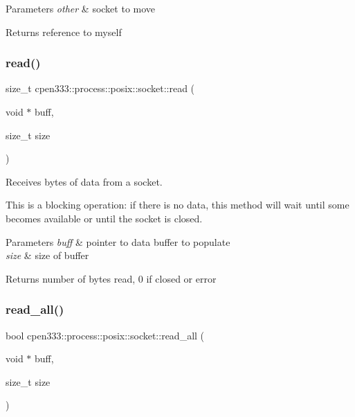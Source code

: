 \begin{DoxyParams}{Parameters}
{\em other} & socket to move \\
\hline
\end{DoxyParams}
\begin{DoxyReturn}{Returns}
reference to myself 
\end{DoxyReturn}
\mbox{\label{classcpen333_1_1process_1_1posix_1_1socket_ae6d3e49cdc4e6f548d9d2850d5697a8e}} 
\subsubsection{\texorpdfstring{read()}{read()}}
{\footnotesize\ttfamily size\+\_\+t cpen333\+::process\+::posix\+::socket\+::read (\begin{DoxyParamCaption}\item[{void $\ast$}]{buff,  }\item[{size\+\_\+t}]{size }\end{DoxyParamCaption})\hspace{0.3cm}{\ttfamily [inline]}}



Receives bytes of data from a socket. 

This is a blocking operation\+: if there is no data, this method will wait until some becomes available or until the socket is closed.


\begin{DoxyParams}{Parameters}
{\em buff} & pointer to data buffer to populate \\
\hline
{\em size} & size of buffer \\
\hline
\end{DoxyParams}
\begin{DoxyReturn}{Returns}
number of bytes read, 0 if closed or error 
\end{DoxyReturn}
\mbox{\label{classcpen333_1_1process_1_1posix_1_1socket_a07e6ea97ebce81ea208f58309cc7f944}} 
\subsubsection{\texorpdfstring{read\+\_\+all()}{read\_all()}}
{\footnotesize\ttfamily bool cpen333\+::process\+::posix\+::socket\+::read\+\_\+all (\begin{DoxyParamCaption}\item[{void $\ast$}]{buff,  }\item[{size\+\_\+t}]{size }\end{DoxyParamCaption})\hspace{0.3cm}{\ttfamily [inline]}}



